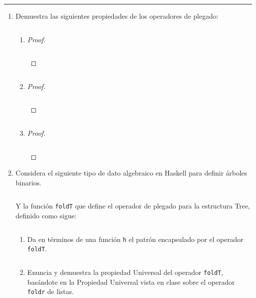 \documentclass[11pt,letterpaper]{article}
\newcommand{\code}[1]{\textcolor{WildStrawberry}{\texttt{#1}}}
\begin{document}
\inputminted{haskell}{assets/def-tails.hs}

\noindent
{\color{WildStrawberry} \rule{\linewidth}{0.4mm} }

\begin{enumerate}
\item Demuestra las siguientes propiedades de los operadores de plegado:

\begin{enumerate}[label=\alph*)]
    \item \inputminted{haskell}{assets/1-a.hs}
    \begin{proof}
        \hfill
        \inputminted{haskell}{assets/1-a-proof.hs}
    \end{proof}

    \item \inputminted{haskell}{assets/1-b.hs}
    \begin{proof}
        \hfill
        \inputminted{haskell}{assets/1-b-proof.hs}
    \end{proof}

    \item \inputminted{haskell}{assets/1-c.hs}
    \begin{proof}
        \hfill
        \inputminted{haskell}{assets/1-c-proof.hs}
    \end{proof}
\end{enumerate}

\item Considera el siguiente tipo de dato algebraico en Haskell para definir árboles binarios.

\inputminted{haskell}{assets/2-1.hs}

Y la función \code{foldT} que define el operador de plegado para la estructura Tree, definido como sigue:

\inputminted{haskell}{assets/2-2.hs}

\begin{enumerate}[label=\alph*)]
    \item Da en términos de una función \code{h} el patrón encapsulado por el operador \code{foldT}.
    
    \inputminted{haskell}{assets/2-a-answer.hs}

    \item Enuncia y demuestra la propiedad Universal del operador \code{foldT}, basándote en la
    Propiedad Universal vista en clase sobre el operador \code{foldr} de listas.


\end{enumerate}
\end{enumerate}
\end{document}
